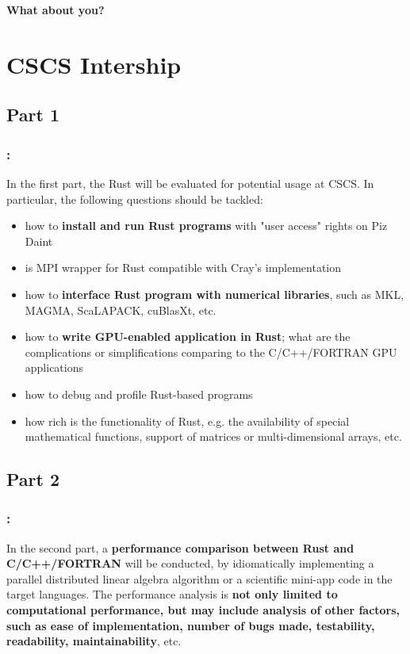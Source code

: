 \documentclass[aspectratio=43, t]{beamer}
\begin{document}
\begin{frame}[c]
	\centering
	\textbf{\Large What about you?}
\end{frame}

\section*{CSCS Intership}
\subsection*{Part 1}
\begin{frame}
	\frametitle{\secname: \subsecname}
	In the first part, the Rust will be evaluated for potential usage at CSCS. In particular, the following questions should be tackled:
	\begin{itemize}
	 	\item how to \textbf{install and run Rust programs} with "user access" rights on Piz Daint
	 	\item is MPI wrapper for Rust compatible with Cray’s implementation
	 	\item how to \textbf{interface Rust program with numerical libraries}, such as MKL, MAGMA, ScaLAPACK, cuBlasXt, etc.
	 	\item how to \textbf{write GPU-enabled application in Rust}; what are the complications or simplifications comparing to the C/C++/FORTRAN GPU applications
	 	\item how to debug and profile Rust-based programs
	 	\item how rich is the functionality of Rust, e.g. the availability of special mathematical functions, support of matrices or multi-dimensional arrays, etc.
	\end{itemize}
\end{frame}

\subsection*{Part 2}
\begin{frame}
	\frametitle{\secname: \subsecname}
	In the second part, a \textbf{performance comparison between Rust and C/C++/FORTRAN} will be conducted, by idiomatically implementing a parallel distributed linear algebra algorithm or a scientific mini-app code in the target languages. The performance analysis is \textbf{not only limited to computational performance, but may include analysis of other factors, such as ease of implementation, number of bugs made, testability, readability, maintainability}, etc.
\end{frame}
\end{document}
